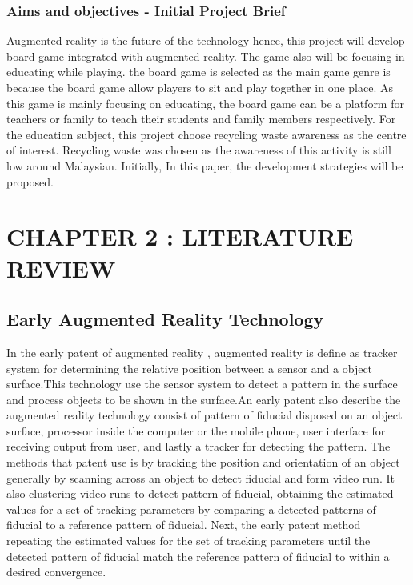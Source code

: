 \documentclass[12pt]{article}
\begin{document}
\subsubsection{Aims and objectives - Initial Project Brief}

Augmented reality is the future of the technology hence, this project will develop board game integrated with augmented reality. The game also will be focusing in educating while playing. the board game is selected as the main game genre is because the board game allow players to sit and play together in one place. As this game is mainly focusing on educating, the board game can be a platform for teachers or family to teach their students and family members respectively. For the education subject, this project choose recycling waste awareness as the centre of interest. Recycling waste was chosen as the awareness of this activity is still low around Malaysian. Initially, In this paper, the development strategies will be proposed.


\pagebreak

\section{CHAPTER 2 : LITERATURE REVIEW}

\subsection{Early Augmented Reality Technology}
In the early patent of augmented reality  \cite{meisner2007augmented}, augmented reality is define as tracker system for determining the relative position between a sensor and a object surface.This technology use the sensor system to detect a pattern in the surface and process objects to be shown in the surface.An early patent also describe the augmented reality technology consist of pattern of fiducial disposed on an object surface, processor inside the computer or the mobile phone, user interface for receiving output from user, and lastly a tracker for detecting the pattern. The methods that patent use is by tracking the position and orientation of an object generally by scanning across an object to detect fiducial and form video run. It also clustering video runs to detect pattern of fiducial, obtaining the estimated values for a set of tracking parameters by comparing a detected patterns of fiducial to a reference pattern of fiducial. Next, the early patent method repeating the estimated values for the set of tracking parameters until the detected pattern of fiducial match the reference pattern of fiducial to within a desired convergence.
\end{document}
